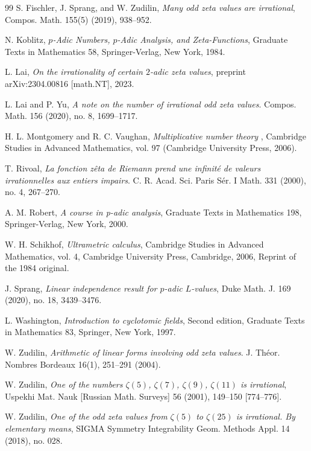 \documentclass[12pt]{article}
\numberwithin{equation}{section}
\begin{document}
\begin{thebibliography}{99}
  S. Fischler, J. Sprang, and W. Zudilin, \textit{Many odd zeta values are irrational}, Compos. Math. 155(5) (2019), 938--952.


 N. Koblitz, \textit{$p$-Adic Numbers, $p$-Adic Analysis, and Zeta-Functions}, Graduate Texts in Mathematics 58, Springer-Verlag, New York, 1984. 

 L. Lai, \textit{On the irrationality of certain $2$-adic zeta values}, preprint arXiv:2304.00816 [math.NT], 2023.

 L. Lai and P. Yu, \textit{A note on the number of irrational odd zeta values}. Compos. Math. 156 (2020), no. 8, 1699--1717.

 H. L. Montgomery and R. C. Vaughan, \textit{Multiplicative number theory \uppercase\expandafter{}}, Cambridge Studies in Advanced Mathematics, vol. 97 (Cambridge University Press, 2006).

 T. Rivoal, \textit{La fonction z{\^e}ta de Riemann prend une infinit{\'e} de valeurs irrationnelles aux entiers impairs}.  C. R. Acad. Sci. Paris S{\'e}r. I Math. 331 (2000), no. 4, 267--270.

 A. M. Robert, \textit{A course in p-adic analysis}, Graduate Texts in Mathematics 198, Springer-Verlag, New York, 2000.

 W. H. Schikhof, \textit{Ultrametric calculus}, Cambridge Studies in Advanced Mathematics, vol. 4, Cambridge
University Press, Cambridge, 2006, Reprint of the 1984 original.

 J. Sprang, \textit{Linear independence result for $p$-adic $L$-values}, Duke Math. J. 169 (2020), no. 18, 3439--3476.

 L. Washington, \textit{Introduction to cyclotomic fields}, Second edition, Graduate Texts in Mathematics 83, Springer, New York, 1997.


 W. Zudilin, \textit{Arithmetic of linear forms involving odd zeta values}. J. Th{\'e}or. Nombres Bordeaux 16(1), 251--291 (2004).

 W. Zudilin, \textit{One of the numbers $\zeta(5)$, $\zeta(7)$, $\zeta(9)$, $\zeta(11)$ is irrational}, Uspekhi Mat. Nauk [Russian Math. Surveys] 56 (2001), 149--150 [774--776].

  W. Zudilin, \textit{One of the odd zeta values from $\zeta(5)$ to $\zeta(25)$ is irrational. By elementary means}, SIGMA Symmetry Integrability Geom. Methods Appl. 14 (2018), no. 028.

\end{thebibliography}
\end{document}
